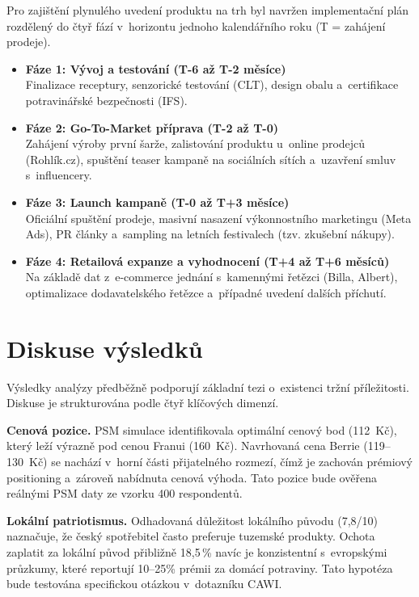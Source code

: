 Pro zajištění plynulého uvedení produktu na trh byl navržen implementační plán rozdělený do čtyř fází v~horizontu jednoho kalendářního roku (T = zahájení prodeje).

\begin{itemize}
  \item \textbf{Fáze 1: Vývoj a testování (T-6 až T-2 měsíce)} \\
  Finalizace receptury, senzorické testování (CLT), design obalu a~certifikace potravinářské bezpečnosti (IFS).
  \item \textbf{Fáze 2: Go-To-Market příprava (T-2 až T-0)} \\
  Zahájení výroby první šarže, zalistování produktu u~online prodejců (Rohlík.cz), spuštění teaser kampaně na sociálních sítích a~uzavření smluv s~influencery.
  \item \textbf{Fáze 3: Launch kampaně (T-0 až T+3 měsíce)} \\
  Oficiální spuštění prodeje, masivní nasazení výkonnostního marketingu (Meta Ads), PR články a~sampling na letních festivalech (tzv. zkušební nákupy).
  \item \textbf{Fáze 4: Retailová expanze a vyhodnocení (T+4 až T+6 měsíců)} \\
  Na základě dat z~e-commerce jednání s~kamennými řetězci (Billa, Albert), optimalizace dodavatelského řetězce a~případné uvedení dalších příchutí.
\end{itemize}

\section{Diskuse výsledků}
\label{sec:res_discussion}

Výsledky analýzy předběžně podporují základní tezi o~existenci tržní příležitosti. Diskuse je strukturována podle čtyř klíčových dimenzí.

\textbf{Cenová pozice.} PSM simulace identifikovala optimální cenový bod (112~Kč), který leží výrazně pod cenou Franui (160~Kč). Navrhovaná cena Berrie (119--130~Kč) se nachází v~horní části přijatelného rozmezí, čímž je zachován prémiový positioning a~zároveň nabídnuta cenová výhoda. Tato pozice bude ověřena reálnými PSM daty ze vzorku 400 respondentů.

\textbf{Lokální patriotismus.} Odhadovaná důležitost lokálního původu (7,8/10) naznačuje, že český spotřebitel často preferuje tuzemské produkty. Ochota zaplatit za lokální původ přibližně 18,5\,\% navíc je konzistentní s~evropskými průzkumy, které reportují 10--25\% prémii za domácí potraviny. Tato hypotéza bude testována specifickou otázkou v~dotazníku CAWI.

